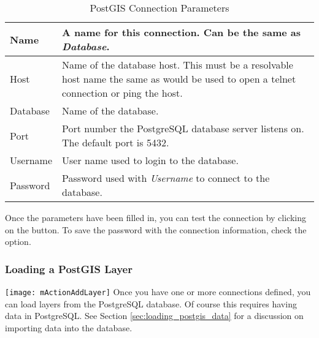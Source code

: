 \begin{table}[ht]
\centering
\caption{PostGIS Connection
Parameters}\label{tab:postgis_connection_parms}\medskip
 \begin{tabular}{|l|p{5in}|}
\hline Name & A name for this connection. Can be the same as \textsl{Database}.
\\
\hline Host \index{PostgreSQL!host}
& Name of the database host. This must be a resolvable host name the same as
would be used to open a telnet connection or ping the host. \\
\hline Database \index{PostgreSQL!database} & Name of the database.  \\
\hline Port \index{PostgreSQL!port}& Port number the PostgreSQL database
server listens on. The default port is 5432.\\
\hline Username \index{PostgreSQL!username}& User name used to login to the
database. \\
\hline Password \index{PostgreSQL!password}& Password used with
\textsl{Username} to connect to the database.\\
\hline
\end{tabular}
\end{table}

Once the parameters have been filled in, you can test the connection by
clicking on the  button. To save the password
with the connection information, check the  option.

\begin{Tip}\caption{\textsc{QGIS User Settings and
Security}}
\end{Tip}

\subsubsection{Loading a PostGIS Layer}

\texttt{[image: mActionAddLayer]} Once you have one or more
connections defined, you can load layers from the PostgreSQL database. Of
course this requires having data in PostgreSQL. See Section
\ref{sec:loading_postgis_data} for a discussion on importing data into the
database. 

